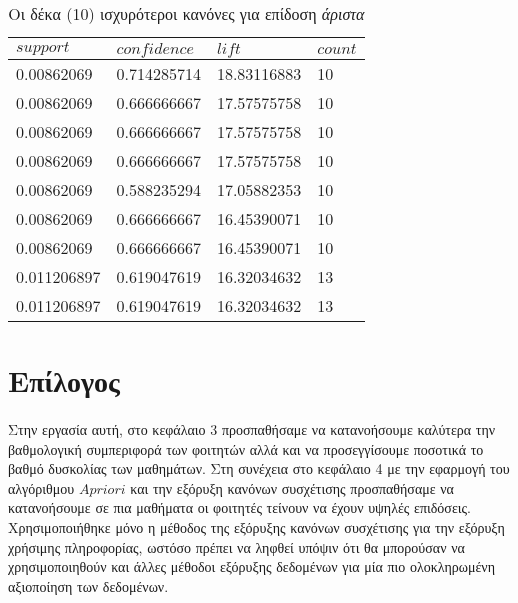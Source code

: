 \documentclass[12pt,a4paper,final]{article}
\begin{document}
\begin{table}
\centering
\caption{Οι δέκα (10) ισχυρότεροι κανόνες για επίδοση \textit{άριστα}}
\label{table_best}
\begin{tabular}{|l|l|l|l|} 
\hline
\textbf{$support$} & \textbf{$confidence$}  & \textbf{$lift$} & \textbf{$count$}  \\ 
\hline
0.00862069       & 0.714285714 & 18.83116883   & 10              \\ 
\hline
0.00862069       & 0.666666667 & 17.57575758   & 10              \\ 
\hline
0.00862069       & 0.666666667 & 17.57575758   & 10              \\ 
\hline
0.00862069       & 0.666666667 & 17.57575758   & 10              \\ 
\hline
0.00862069       & 0.588235294 & 17.05882353   & 10              \\ 
\hline
0.00862069       & 0.666666667 & 16.45390071   & 10              \\ 
\hline
0.00862069       & 0.666666667 & 16.45390071   & 10              \\ 
\hline
0.011206897      & 0.619047619 & 16.32034632   & 13              \\ 
\hline
0.011206897      & 0.619047619 & 16.32034632   & 13              \\
\hline
\end{tabular}
\end{table}

\clearpage
\section{Επίλογος}

\paragraph{}

Στην εργασία αυτή, στο κεφάλαιο 3 προσπαθήσαμε να κατανοήσουμε καλύτερα την βαθμολογική συμπεριφορά των φοιτητών αλλά και να προσεγγίσουμε ποσοτικά το βαθμό δυσκολίας των μαθημάτων. Στη συνέχεια στο κεφάλαιο 4 με την εφαρμογή του  αλγόριθμου $Apriori$ και την εξόρυξη κανόνων συσχέτισης προσπαθήσαμε να κατανοήσουμε σε πια μαθήματα οι φοιτητές τείνουν να έχουν υψηλές επιδόσεις. 
Χρησιμοποιήθηκε μόνο η μέθοδος της εξόρυξης κανόνων συσχέτισης για την εξόρυξη χρήσιμης πληροφορίας, ωστόσο πρέπει να ληφθεί υπόψιν ότι θα μπορούσαν να χρησιμοποιηθούν και άλλες μέθοδοι εξόρυξης δεδομένων για μία πιο ολοκληρωμένη αξιοποίηση των δεδομένων.
\end{document}
